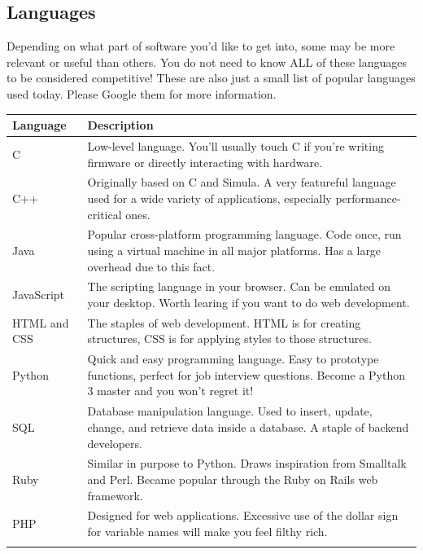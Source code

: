 \documentclass{article}
\begin{document}
\subsection{Languages}
Depending on what part of software you'd like to get into, some may be more
relevant or useful than others. You do not need to know ALL of these languages
to be considered competitive! These are also just a small list of popular
languages used today. Please Google them for more information.
\begin{center}
\begin{tabular} {l p{10cm}}
  \toprule
  \textbf{Language}
  & \textbf{Description}\\
  \midrule
  C
  & Low-level language. You'll usually touch C if you're writing firmware or
    directly interacting with hardware.\\
  \addlinespace[0.5em]
  C++
  & Originally based on C and Simula. A very featureful language used for a wide
    variety of applications, especially performance-critical ones.\\
  \addlinespace[0.5em]
  Java
  & Popular cross-platform programming language. Code once, run using a virtual
    machine in all major platforms. Has a large overhead due to this fact.\\
  \addlinespace[0.5em]
  JavaScript
  & The scripting language in your browser. Can be emulated on your
    desktop. Worth learing if you want to do web development.\\
  \addlinespace[0.5em]
  HTML and CSS
  & The staples of web development. HTML is for creating structures, CSS is for
    applying styles to those structures.\\
  \addlinespace[0.5em]
  Python
  & Quick and easy programming language. Easy to prototype functions, perfect
    for job interview questions. Become a Python 3 master and you won't regret
    it!\\
  \addlinespace[0.5em]
  SQL
  & Database manipulation language. Used to insert, update, change, and retrieve
    data inside a database. A staple of backend developers.\\
  \addlinespace[0.5em]
  Ruby
  & Similar in purpose to Python. Draws inspiration from Smalltalk and
    Perl. Became popular through the Ruby on Rails web framework.\\
  \addlinespace[0.5em]
  PHP
  & Designed for web applications. Excessive use of the dollar sign for
    variable names will make you feel filthy rich.\\
  \addlinespace[0.5em]

\end{tabular}
\end{center}
\end{document}
